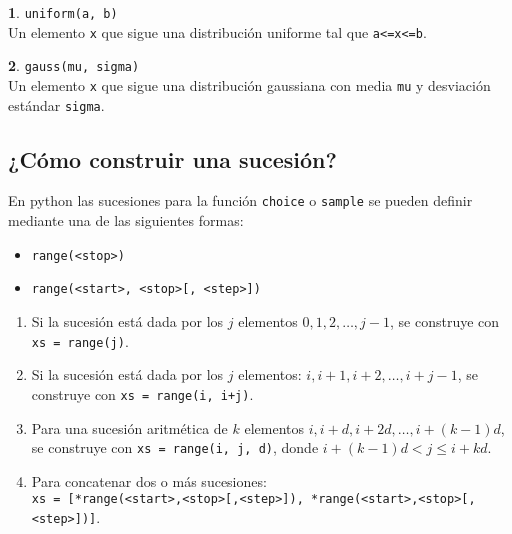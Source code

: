 \documentclass[12pt]{article}
\theoremstyle{definition}
\newtheorem{funcion}{}[section]
\begin{document}
\begin{funcion}
  \verb|uniform(a, b)| \\[1ex]
  Un elemento \verb|x| que sigue una distribución uniforme tal que \verb|a<=x<=b|.
\end{funcion}

\begin{funcion}
  \verb|gauss(mu, sigma)| \\[1ex]
  Un elemento \verb|x| que sigue una distribución gaussiana con media \verb|mu| y desviación estándar \verb|sigma|.
\end{funcion}

\subsection{¿Cómo construir una sucesión?}

En python las sucesiones para la función \verb|choice| o \verb|sample| se pueden definir mediante una de las siguientes formas:
\begin{itemize}
  \item \verb|range(<stop>)|
  \item \verb|range(<start>, <stop>[, <step>])|
\end{itemize}


\begin{enumerate}
  \item Si la sucesión está dada por los $j$ elementos $0, 1, 2, \dots, j - 1$, se construye con \verb|xs = range(j)|.
  \item Si la sucesión está dada por los $j$ elementos: $i, i+1, i+2, \dots, i + j - 1$, se construye con \verb|xs = range(i, i+j)|.
  \item Para una sucesión aritmética de $k$ elementos $i, i + d, i + 2d, \dots, i + (k-1)d$, se construye con \verb|xs = range(i, j, d)|, donde $i + (k-1)d < j \leq i + kd$.
  \item Para concatenar dos o más sucesiones:\\[1ex]
    \verb|xs = [*range(<start>,<stop>[,<step>]), *range(<start>,<stop>[,<step>])]|.
\end{enumerate}
\end{document}

